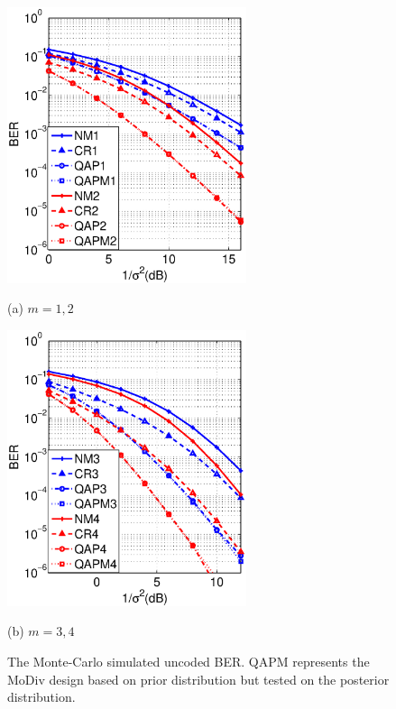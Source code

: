 \documentclass[journal,draftcls,onecolumn,12pt,twoside]{IEEEtran}
\begin{document}
\begin{figure}[htb]
  \begin{minipage}[b]{.48\linewidth}
    \centering
    \centerline{\includegraphics[width=7cm]{./figs/BER_noise_power_mismatch_MonteCarlo_64QAM_23.eps}}
    \centerline{(a) $m=1,2$}\medskip
  \end{minipage}
  \hfill
  \begin{minipage}[b]{0.48\linewidth}
    \centering
    \centerline{\includegraphics[width=7cm]{./figs/BER_noise_power_mismatch_MonteCarlo_64QAM_45.eps}}
    \centerline{(b) $m=3,4$}\medskip
  \end{minipage}
  \caption{The Monte-Carlo simulated uncoded BER. QAPM represents the MoDiv
  design based on prior distribution but tested on the posterior distribution.}
  \label{fig:mismatch}
\end{figure}
\end{document}
